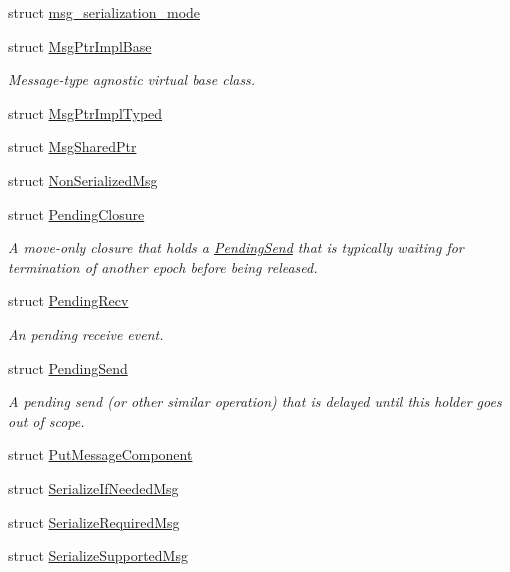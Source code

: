 \begin{DoxyCompactItemize}
struct \hyperlink{structvt_1_1messaging_1_1msg__serialization__mode}{msg\+\_\+serialization\+\_\+mode}
\item 
struct \hyperlink{structvt_1_1messaging_1_1_msg_ptr_impl_base}{Msg\+Ptr\+Impl\+Base}
\begin{DoxyCompactList}\small\item\em Message-\/type agnostic virtual base class. \end{DoxyCompactList}\item 
struct \hyperlink{structvt_1_1messaging_1_1_msg_ptr_impl_typed}{Msg\+Ptr\+Impl\+Typed}
\item 
struct \hyperlink{structvt_1_1messaging_1_1_msg_shared_ptr}{Msg\+Shared\+Ptr}
\item 
struct \hyperlink{structvt_1_1messaging_1_1_non_serialized_msg}{Non\+Serialized\+Msg}
\item 
struct \hyperlink{structvt_1_1messaging_1_1_pending_closure}{Pending\+Closure}
\begin{DoxyCompactList}\small\item\em A move-\/only closure that holds a {\ttfamily \hyperlink{structvt_1_1messaging_1_1_pending_send}{Pending\+Send}} that is typically waiting for termination of another epoch before being released. \end{DoxyCompactList}\item 
struct \hyperlink{structvt_1_1messaging_1_1_pending_recv}{Pending\+Recv}
\begin{DoxyCompactList}\small\item\em An pending receive event. \end{DoxyCompactList}\item 
struct \hyperlink{structvt_1_1messaging_1_1_pending_send}{Pending\+Send}
\begin{DoxyCompactList}\small\item\em A pending send (or other similar operation) that is delayed until this holder goes out of scope. \end{DoxyCompactList}\item 
struct \hyperlink{structvt_1_1messaging_1_1_put_message_component}{Put\+Message\+Component}
\item 
struct \hyperlink{structvt_1_1messaging_1_1_serialize_if_needed_msg}{Serialize\+If\+Needed\+Msg}
\item 
struct \hyperlink{structvt_1_1messaging_1_1_serialize_required_msg}{Serialize\+Required\+Msg}
\item 
struct \hyperlink{structvt_1_1messaging_1_1_serialize_supported_msg}{Serialize\+Supported\+Msg}

\end{DoxyCompactItemize}

